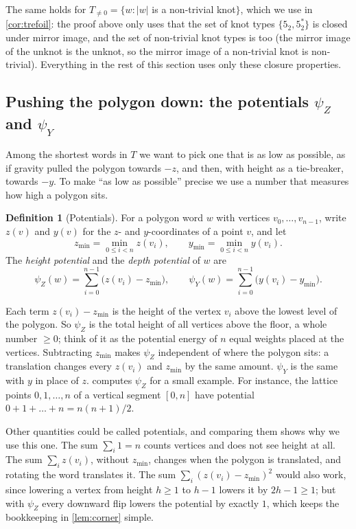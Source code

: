 \documentclass[11pt]{article}
\theoremstyle{plain}
\theoremstyle{definition}
\newtheorem{definition}[theorem]{Definition}
\theoremstyle{remark}
\newcommand{\psiZ}{\psi_Z}
\newcommand{\psiY}{\psi_Y}
\begin{document}
The same holds for $T_{\neq0}=\{w:|w|$ is a non-trivial knot$\}$, which we use in \cref{cor:trefoil}:
the proof above only uses that the set of knot types $\{5_2,5_2^*\}$ is closed under mirror image, and
the set of non-trivial knot types is too (the mirror image of the unknot is the unknot, so the mirror
image of a non-trivial knot is non-trivial). Everything in the rest of this section uses only these closure properties.

\subsection{Pushing the polygon down: the potentials $\psiZ$ and $\psiY$}

Among the shortest words in $T$ we want to pick one that is as low as possible, as if gravity pulled
the polygon towards $-z$, and then, with height as a tie-breaker, towards $-y$. To make ``as low as
possible'' precise we use a number that measures how high a polygon sits.

\begin{definition}[Potentials]\label{def:psi}
For a polygon word $w$ with vertices $v_0,\dots,v_{n-1}$, write $z(v)$ and $y(v)$ for the $z$- and
$y$-coordinates of a point $v$, and let
\[ z_{\min}=\min_{0\le i<n} z(v_i), \qquad y_{\min}=\min_{0\le i<n} y(v_i). \]
The \emph{height potential} and the \emph{depth potential} of $w$ are
\[ \psiZ(w)=\sum_{i=0}^{n-1}\bigl(z(v_i)-z_{\min}\bigr), \qquad \psiY(w)=\sum_{i=0}^{n-1}\bigl(y(v_i)-y_{\min}\bigr). \]
\end{definition}

Each term $z(v_i)-z_{\min}$ is the height of the vertex $v_i$ above the lowest level of the polygon.
So $\psiZ$ is the total height of all vertices above the floor, a whole number $\ge0$; think of it as
the potential energy of $n$ equal weights placed at the vertices. Subtracting $z_{\min}$ makes $\psiZ$
independent of where the polygon sits: a translation changes every $z(v_i)$ and $z_{\min}$ by the same
amount. $\psiY$ is the same with $y$ in place of $z$.  computes $\psiZ$ for a small
example. For instance, the lattice points $0,1,\dots,n$ of a vertical segment $[0,n]$ have potential
$0+1+\dots+n=n(n+1)/2$.

Other quantities could be called potentials, and comparing them shows why we use this one. The sum
$\sum_i 1=n$ counts vertices and does not see height at all. The sum $\sum_i z(v_i)$, without
$z_{\min}$, changes when the polygon is translated, and rotating the word translates it. The sum
$\sum_i(z(v_i)-z_{\min})^2$ would also work, since lowering a vertex from height $h\ge1$ to $h-1$ lowers it by
$2h-1\ge1$; but with $\psiZ$ every downward flip lowers the potential by exactly $1$, which keeps the
bookkeeping in \cref{lem:corner} simple.
\end{document}
